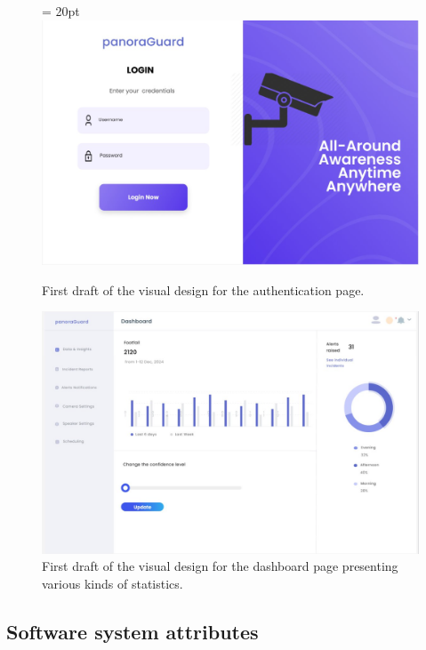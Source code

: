 \documentclass{article}
\begin{document}
\begin{figure}[H]
    \centering
    \topmargin = 20pt
\includegraphics[width=0.75\linewidth]{authenticationPageFirstDesignDraft.png}

    \caption[width=0.75]{First draft of the visual design for the authentication page.
    }
    
    \label{fig:authenticationPageFirstDraft}

    \includegraphics[width=0.75\linewidth]{dashboardFirstDesignDraft.png}
    \caption[width=0.75]{First draft of the visual design for the dashboard page presenting various kinds of statistics.}
    \label{fig:dashboardPageFirstDraft}
\end{figure}


\subsection{Software system attributes}
\end{document}
